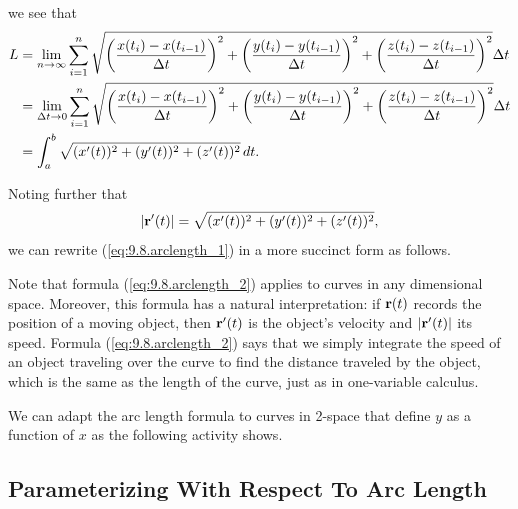 we see that
\begin{align}
L &= \lim_{n \to \infty} \sum_{i=1}^n \sqrt{\left(\frac{x(t_i) - x(t_{i-1})}{\Delta t}\right)^2 + \left(\frac{y(t_i) - y(t_{i-1})}{\Delta t}\right)^2 + \left(\frac{z(t_i) - z(t_{i-1})}{\Delta t}\right)^2} \Delta t \notag \\
    &= \lim_{\Delta t \to 0} \sum_{i=1}^n \sqrt{\left(\frac{x(t_i) - x(t_{i-1})}{\Delta t}\right)^2 + \left(\frac{y(t_i) - y(t_{i-1})}{\Delta t}\right)^2 + \left(\frac{z(t_i) - z(t_{i-1})}{\Delta t}\right)^2} \Delta t \notag \\
    &= \int_a^b \sqrt{(x'(t))^2 + (y'(t))^2 + (z'(t))^2} \, dt. \label{eq:9.8.arclength_1}
\end{align}

Noting further that
\[|\mathbf{r}'(t)| = \sqrt{(x'(t))^2 + (y'(t))^2 + (z'(t))^2},\]
we can rewrite (\ref{eq:9.8.arclength_1}) in a more succinct form as follows.

\vspace*{5pt}
\nin {}
\vspace*{5pt}

Note that formula (\ref{eq:9.8.arclength_2}) applies to curves in any
dimensional space.  Moreover, this formula has a natural interpretation: if
$\mathbf{r}(t)$ records the position of a moving object, then $\mathbf{r}'(t)$ is
the object's velocity and $|\mathbf{r}'(t)|$ its speed.  Formula
(\ref{eq:9.8.arclength_2}) says that we simply integrate the speed of
an object traveling over the curve to find the distance traveled by
the object, which is the same as the length of the curve,
just as in one-variable calculus.




%


We can adapt the arc length formula to curves in 2-space that define
$y$ as a function of $x$ as the following activity shows.



\subsection*{Parameterizing With Respect To Arc Length}

